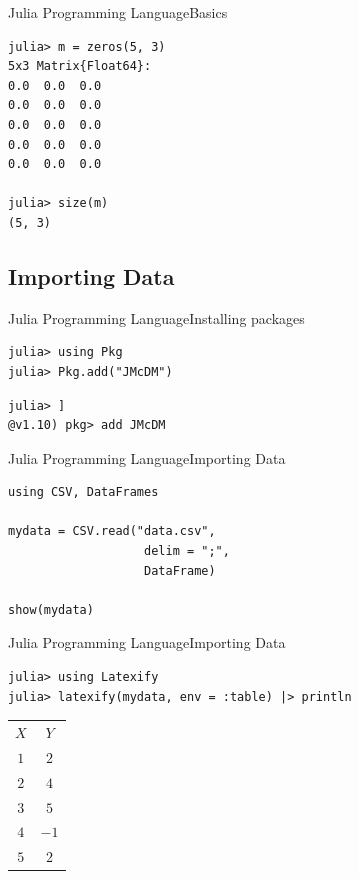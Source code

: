\documentclass[11pt]{beamer}
\begin{document}
\begin{frame}[fragile]{Julia Programming Language}{Basics}
\begin{lstlisting}
julia> m = zeros(5, 3)
5x3 Matrix{Float64}:
0.0  0.0  0.0
0.0  0.0  0.0
0.0  0.0  0.0
0.0  0.0  0.0
0.0  0.0  0.0

julia> size(m)
(5, 3)
\end{lstlisting}
\end{frame}

\subsection{Importing Data}

\begin{frame}[fragile]{Julia Programming Language}{Installing packages}
\begin{lstlisting}
julia> using Pkg
julia> Pkg.add("JMcDM")
\end{lstlisting}

\begin{lstlisting}
julia> ]
@v1.10) pkg> add JMcDM
\end{lstlisting}
\end{frame}

\begin{frame}[fragile]{Julia Programming Language}{Importing Data}
\begin{lstlisting}
using CSV, DataFrames

mydata = CSV.read("data.csv", 
				   delim = ";", 
				   DataFrame)

show(mydata)
\end{lstlisting}
\end{frame}


\begin{frame}[fragile]{Julia Programming Language}{Importing Data}
\begin{lstlisting}
julia> using Latexify
julia> latexify(mydata, env = :table) |> println
\end{lstlisting}

\begin{tabular}{cc}
$X$ & $ Y$\\
$1$ & $2$\\
$2$ & $4$\\
$3$ & $5$\\
$4$ & $-1$\\
$5$ & $2$\\
\end{tabular}

\end{frame}
\end{document}
